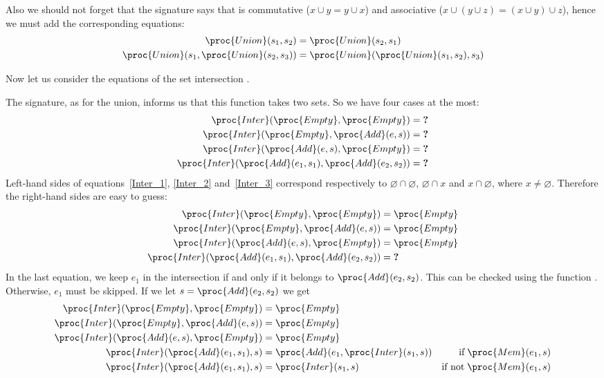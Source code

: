    Also we should not forget that the signature says that 
   is commutative (\(x \cup y = y \cup x\)) and associative (\(x \cup
   (y \cup z) = (x \cup y) \cup z\)), hence we must add the
   corresponding equations:
   \begin{align}
       \proc{Union} (s_1, s_2) 
    &= \proc{Union} (s_2, s_1) \label{Union_5}\\
       \proc{Union} (s_1, \proc{Union} (s_2, s_3))
    &= \proc{Union} (\proc{Union} (s_1, s_2),
       s_3) \label{Union_6}
   \end{align}

   Now let us consider the equations of the set intersection
   .

   The signature, as for the union, informs us that this function
   takes two sets. So we have four cases at the most:
   \begin{align}
      \proc{Inter} (\proc{Empty}, \proc{Empty})
   &= \textbf{?} \label{Inter_1}\\
      \proc{Inter} (\proc{Empty}, \proc{Add} (e, s))
   &= \textbf{?} \label{Inter_2}\\
      \proc{Inter} (\proc{Add} (e, s), \proc{Empty})
   &= \textbf{?} \label{Inter_3}\\
      \proc{Inter} (\proc{Add} (e_1, s_1), \proc{Add}
      (e_2, s_2))
   &= \textbf{?} \label{Inter_4}
   \end{align}
   Left-hand sides of equations~\ref{Inter_1}, \ref{Inter_2}
   and~\ref{Inter_3} correspond respectively to \(\varnothing \cap
   \varnothing\), \(\varnothing \cap x\) and \(x \cap \varnothing\),
   where \(x \neq \varnothing\). Therefore the right-hand sides are
   easy to guess:
   \begin{align*}
      \proc{Inter} (\proc{Empty}, \proc{Empty})
   &= \proc{Empty}\\
      \proc{Inter} (\proc{Empty}, \proc{Add} (e, s))
   &= \proc{Empty}\\
      \proc{Inter} (\proc{Add} (e, s), \proc{Empty})
   &= \proc{Empty}\\
      \proc{Inter} (\proc{Add} (e_1, s_1), \proc{Add}
      (e_2, s_2))
   &= \textbf{?}
   \end{align*}
   In the last equation, we keep \(e_1\) in the intersection if and
   only if it belongs to \(\proc{Add} (e_2, s_2)\). This can
   be checked using the function . Otherwise, \(e_1\) must
   be skipped. If we let \(s = \proc{Add} (e_2, s_2)\)
   we get
   \begin{align*}
      \proc{Inter} (\proc{Empty}, \proc{Empty})
   &= \proc{Empty}\\
      \proc{Inter} (\proc{Empty}, \proc{Add} (e, s))
   &= \proc{Empty}\\
      \proc{Inter} (\proc{Add} (e, s), \proc{Empty})
   &= \proc{Empty}\\
      \proc{Inter} (\proc{Add} (e_1, s_1), s)
   &= \proc{Add} (e_1, \proc{Inter} (s_1, s))
   & \text{if} \; \proc{Mem} (e_1, s)\\
      \proc{Inter} (\proc{Add} (e_1, s_1), s)
   &= \proc{Inter} (s_1, s)
   & \text{if not} \; \proc{Mem} (e_1, s)
   \end{align*}
